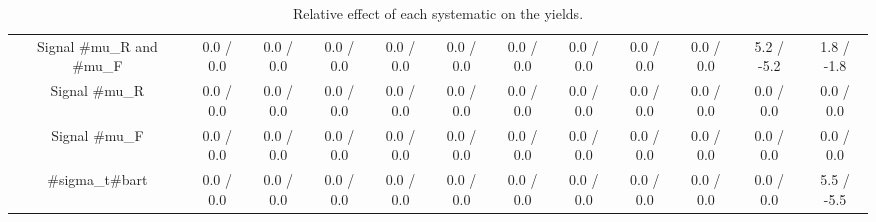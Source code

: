 \begin{table}[htbp]
\begin{center}
\begin{tabular}{|c|c|c|c|c|c|c|c|c|c|c|c|}
  Signal #mu_{R} and #mu_{F} & 0.0 / 0.0 & 0.0 / 0.0 & 0.0 / 0.0 & 0.0 / 0.0 & 0.0 / 0.0 & 0.0 / 0.0 & 0.0 / 0.0 & 0.0 / 0.0 & 0.0 / 0.0 & 5.2 / -5.2 & 1.8 / -1.8 \\ 
  Signal #mu_{R} & 0.0 / 0.0 & 0.0 / 0.0 & 0.0 / 0.0 & 0.0 / 0.0 & 0.0 / 0.0 & 0.0 / 0.0 & 0.0 / 0.0 & 0.0 / 0.0 & 0.0 / 0.0 & 0.0 / 0.0 & 0.0 / 0.0 \\ 
  Signal #mu_{F} & 0.0 / 0.0 & 0.0 / 0.0 & 0.0 / 0.0 & 0.0 / 0.0 & 0.0 / 0.0 & 0.0 / 0.0 & 0.0 / 0.0 & 0.0 / 0.0 & 0.0 / 0.0 & 0.0 / 0.0 & 0.0 / 0.0 \\ 
  #sigma_{t#bar{t}} & 0.0 / 0.0 & 0.0 / 0.0 & 0.0 / 0.0 & 0.0 / 0.0 & 0.0 / 0.0 & 0.0 / 0.0 & 0.0 / 0.0 & 0.0 / 0.0 & 0.0 / 0.0 & 0.0 / 0.0 & 5.5 / -5.5 \\ 
\hline 
\end{tabular} 
\caption{Relative effect of each systematic on the yields.} 
\end{center} 
\end{table} 
